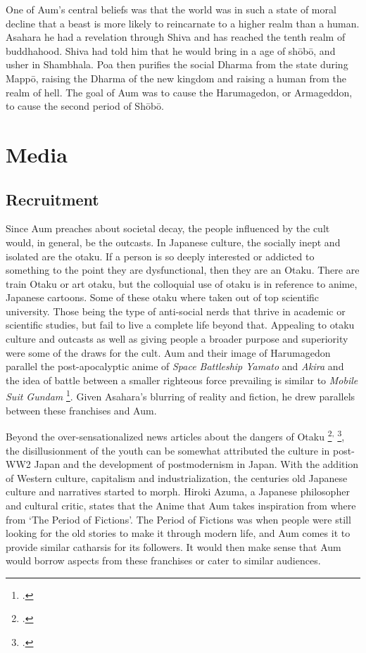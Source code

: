 \documentclass[12pt, letterpaper]{article}
\newcommand{\sorta}[1]{`#1'}
\newcommand{\poses}[1]{#1's}
\begin{document}
One of \poses{Aum} central beliefs was that the world was in such a state of moral decline that a beast is 
more likely to reincarnate to a higher realm than a human. Asahara he had a revelation through Shiva and has
reached the tenth realm of buddhahood. Shiva had told him that he would bring in a age of sh\=ob\=o, and
usher in Shambhala. Poa then purifies the social Dharma from the state during Mapp\=o, raising the 
Dharma of the new kingdom and raising a human from the realm of hell. The goal of Aum was to cause the 
Harumagedon, or Armageddon, to cause the second period of Sh\=ob\=o.

\section{Media}
\subsection{Recruitment}
Since Aum preaches about societal decay, the people influenced by the cult would, in general, be the 
outcasts. In Japanese culture, the socially inept and isolated are the otaku. If a person is so deeply interested or
addicted to something to the point they are dysfunctional, then they are an Otaku. There are train Otaku or
art otaku, but the colloquial use of otaku is in reference to anime, Japanese cartoons.  Some of these otaku
where taken out of top scientific university. Those being the type of anti-social nerds that thrive in
academic or scientific studies, but fail to live a complete life beyond that. Appealing to otaku culture and
outcasts as well as giving people a broader purpose and superiority were some of the draws for the cult. Aum
and their image of Harumagedon parallel the post-apocalyptic anime of \textit{Space Battleship Yamato} and
\textit{Akira} and the idea of battle between a smaller righteous force prevailing is similar to
\textit{Mobile Suit Gundam} \footcite{macwilliams_japanese_2008}. Given \poses{Asahara} blurring of reality and fiction, he drew parallels between these franchises and Aum. 

Beyond the over-sensationalized news articles about the dangers of Otaku 
\footcite{noauthor_mike_nodate}\textsuperscript{,}
\footcite{noauthor_cult_nodate}, the disillusionment of the youth can be somewhat attributed the culture in
post-WW2 Japan and the development of postmodernism in Japan. With the addition of Western culture, 
capitalism and industrialization, the centuries old Japanese culture and narratives started to morph. Hiroki
Azuma, a Japanese philosopher and cultural critic, states that the Anime that Aum takes inspiration from 
where from \sorta{The Period of Fictions}. The Period of Fictions was when people were still looking for the
old stories to make it through modern life, and Aum comes it to provide similar catharsis for its followers.
It would then make sense that Aum would borrow aspects from these franchises or cater to similar audiences.
\end{document}
